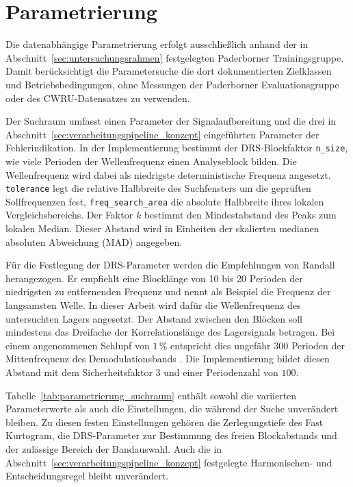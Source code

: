 \section{Parametrierung}
\label{sec:parametrierungsstrategie}

Die datenabhängige Parametrierung erfolgt ausschließlich anhand der in
Abschnitt~\ref{sec:untersuchungsrahmen} festgelegten Paderborner
Trainingsgruppe. Damit berücksichtigt die Parametersuche die dort
dokumentierten Zielklassen und Betriebsbedingungen, ohne Messungen der
Paderborner Evaluationsgruppe oder des CWRU-Datensatzes zu verwenden.

Der Suchraum umfasst einen Parameter der Signalaufbereitung und die drei in
Abschnitt~\ref{sec:verarbeitungspipeline_konzept} eingeführten Parameter der
Fehlerindikation. In der Implementierung bestimmt der DRS-Blockfaktor
\texttt{n\_size}, wie viele Perioden der Wellenfrequenz einen Analyseblock
bilden. Die Wellenfrequenz wird dabei als niedrigste deterministische Frequenz
angesetzt.
\texttt{tolerance} legt die relative Halbbreite des Suchfensters um die
geprüften Sollfrequenzen fest, \texttt{freq\_search\_area} die absolute
Halbbreite ihres lokalen Vergleichsbereichs. Der Faktor $k$ bestimmt den
Mindestabstand des Peaks zum lokalen Median. Dieser Abstand wird in Einheiten
der skalierten medianen absoluten Abweichung (MAD) angegeben.

Für die Festlegung der DRS-Parameter werden die Empfehlungen von Randall
herangezogen. Er empfiehlt eine Blocklänge von 10 bis 20 Perioden der
niedrigsten zu entfernenden Frequenz und nennt als Beispiel die Frequenz der
langsamsten Welle. In dieser Arbeit wird dafür die Wellenfrequenz des
untersuchten Lagers angesetzt. Der Abstand zwischen den Blöcken soll mindestens
das Dreifache der Korrelationslänge des Lagersignals betragen. Bei einem
angenommenen Schlupf von $1\,\%$ entspricht dies ungefähr 300 Perioden der
Mittenfrequenz des Demodulationsbands
\cite[S.~277, Abschn.~7.3.2]
{randallVibrationbasedConditionMonitoring2022}. Die Implementierung bildet
diesen Abstand mit dem Sicherheitsfaktor $3$ und einer Periodenzahl von $100$.

Tabelle~\ref{tab:parametrierung_suchraum} enthält sowohl die variierten
Parameterwerte als auch die Einstellungen, die während der Suche unverändert
bleiben. Zu diesen festen Einstellungen gehören die
Zerlegungstiefe des Fast Kurtogram, die DRS-Parameter zur Bestimmung des freien
Blockabstands und der zulässige Bereich der Bandauswahl. Auch die in
Abschnitt~\ref{sec:verarbeitungspipeline_konzept} festgelegte Harmonischen- und
Entscheidungsregel bleibt unverändert.

